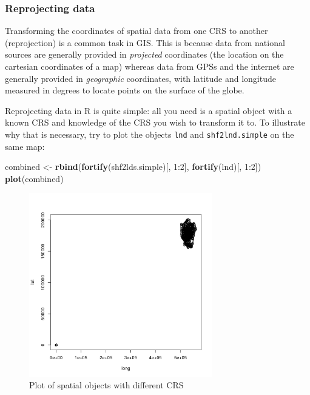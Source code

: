 \documentclass[]{article}
\newenvironment{Shaded}{}{}
\newcommand{\KeywordTok}[1]{\textcolor[rgb]{0.00,0.44,0.13}{\textbf{{#1}}}}
\newcommand{\DecValTok}[1]{\textcolor[rgb]{0.25,0.63,0.44}{{#1}}}
\newcommand{\NormalTok}[1]{{#1}}
\let\Oldincludegraphics\includegraphics
\renewcommand{\includegraphics}[1]{\Oldincludegraphics[width=8cm]{#1}}
\begin{document}
\subsubsection{Reprojecting data}

Transforming the coordinates of spatial data from one CRS to another
(reprojection) is a common task in GIS. This is because data from
national sources are generally provided in \emph{projected} coordinates
(the location on the cartesian coordinates of a map) whereas data from
GPSs and the internet are generally provided in \emph{geographic}
coordinates, with latitude and longitude measured in degrees to locate
points on the surface of the globe.

Reprojecting data in R is quite simple: all you need is a spatial object
with a known CRS and knowledge of the CRS you wish to transform it to.
To illustrate why that is necessary, try to plot the objects
\texttt{lnd} and \texttt{shf2lnd.simple} on the same map:

\begin{Shaded}
\begin{Highlighting}[]
\NormalTok{combined <- }\KeywordTok{rbind}\NormalTok{(}\KeywordTok{fortify}\NormalTok{(shf2lds.simple)[, }\DecValTok{1}\NormalTok{:}\DecValTok{2}\NormalTok{], }\KeywordTok{fortify}\NormalTok{(lnd)[, }\DecValTok{1}\NormalTok{:}\DecValTok{2}\NormalTok{])}
\KeywordTok{plot}\NormalTok{(combined)}
\end{Highlighting}
\end{Shaded}
\begin{figure}[htbp]
\centering
\includegraphics{figure/Plot_of_spatial_objects_with_different_CRS.png}
\caption{Plot of spatial objects with different CRS}
\end{figure}
\end{document}
